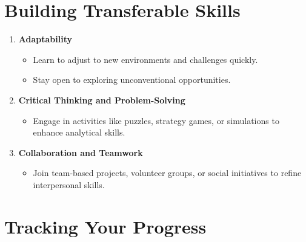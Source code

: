 \documentclass[
  letterpaper,
  DIV=11,
  numbers=noendperiod]{scrreprt}
\providecommand{\tightlist}{%
  \setlength{\itemsep}{0pt}\setlength{\parskip}{0pt}}\usepackage{longtable,booktabs,array}
\begin{document}
\section{Building Transferable
Skills}\label{building-transferable-skills}

\begin{enumerate}
\def\labelenumi{\arabic{enumi}.}
\item
  \textbf{Adaptability}

  \begin{itemize}
  \tightlist
  \item
    Learn to adjust to new environments and challenges quickly.
  \item
    Stay open to exploring unconventional opportunities.
  \end{itemize}
\item
  \textbf{Critical Thinking and Problem-Solving}

  \begin{itemize}
  \tightlist
  \item
    Engage in activities like puzzles, strategy games, or simulations to
    enhance analytical skills.
  \end{itemize}
\item
  \textbf{Collaboration and Teamwork}

  \begin{itemize}
  \tightlist
  \item
    Join team-based projects, volunteer groups, or social initiatives to
    refine interpersonal skills.
  \end{itemize}
\end{enumerate}

\section{Tracking Your Progress}\label{tracking-your-progress}
\end{document}
